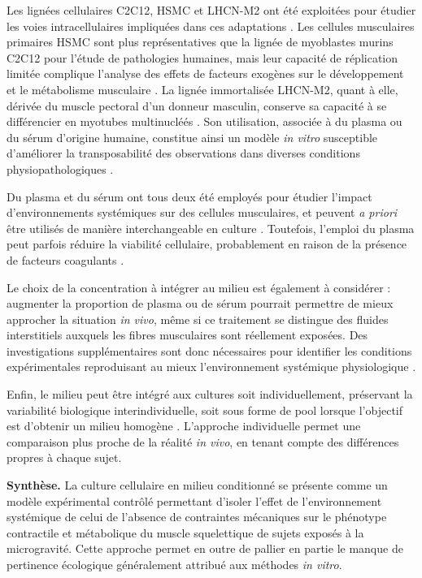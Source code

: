 \documentclass[11pt]{report}
\begin{document}
Les lignées cellulaires C2C12, HSMC et LHCN-M2 ont été exploitées pour étudier les voies intracellulaires impliquées dans ces adaptations \parencite{Allen2022Dec}. Les cellules musculaires primaires HSMC sont plus représentatives que la lignée de myoblastes murins C2C12 pour l'étude de pathologies humaines, mais leur capacité de réplication limitée complique l'analyse des effets de facteurs exogènes sur le développement et le métabolisme musculaire \parencite{Aas2013Dec}. La lignée immortalisée LHCN-M2, quant à elle, dérivée du muscle pectoral d'un donneur masculin, conserve sa capacité à se différencier en myotubes multinucléés \parencite{Zhu2007Aug}. Son utilisation, associée à du plasma ou du sérum d'origine humaine, constitue ainsi un modèle \textit{in vitro} susceptible d'améliorer la transposabilité des observations dans diverses conditions physiopathologiques \parencite{Turner2023Feb}.

Du plasma et du sérum ont tous deux été employés pour étudier l'impact d'environnements systémiques sur des cellules musculaires, et peuvent \textit{a priori} être utilisés de manière interchangeable en culture \parencite{Allen2022Dec}. Toutefois, l'emploi du plasma peut parfois réduire la viabilité cellulaire, probablement en raison de la présence de facteurs coagulants \parencite{Allen2022Dec}. 

Le choix de la concentration à intégrer au milieu est également à considérer : augmenter la proportion de plasma ou de sérum pourrait permettre de mieux approcher la situation \textit{in vivo}, même si ce traitement se distingue des fluides interstitiels auxquels les fibres musculaires sont réellement exposées. Des investigations supplémentaires sont donc nécessaires pour identifier les conditions expérimentales reproduisant au mieux l'environnement systémique physiologique \parencite{Allen2022Dec}. 

Enfin, le milieu peut être intégré aux cultures soit individuellement, préservant la variabilité biologique interindividuelle, soit sous forme de pool lorsque l'objectif est d'obtenir un milieu homogène \parencite{Allen2022Dec}. L'approche individuelle permet une comparaison plus proche de la réalité \textit{in vivo}, en tenant compte des différences propres à chaque sujet.

\begin{tcolorbox}[colback=gray!3,colframe=gray!50, width=\textwidth]
	\textbf{Synthèse.} La culture cellulaire en milieu conditionné se présente comme un modèle expérimental contrôlé permettant d'isoler l'effet de l'environnement systémique de celui de l'absence de contraintes mécaniques sur le phénotype contractile et métabolique du muscle squelettique de sujets exposés à la microgravité. Cette approche permet en outre de pallier en partie le manque de pertinence écologique généralement attribué aux méthodes \textit{in vitro}.
\end{tcolorbox}
\end{document}
